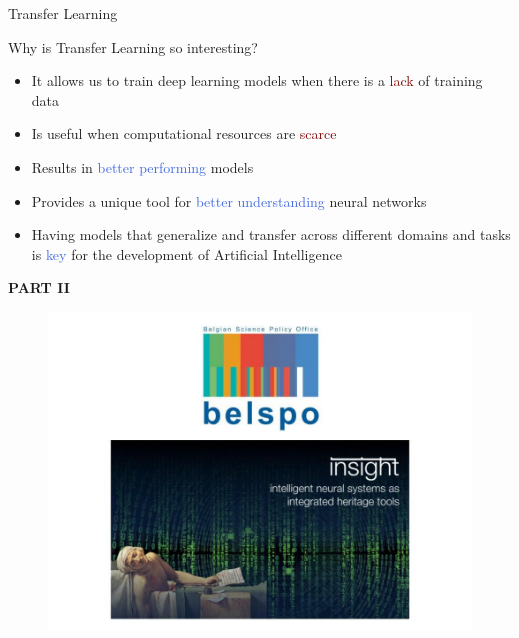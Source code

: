 \documentclass{beamer}
\begin{document}
\begin{frame}{Transfer Learning}

	Why is Transfer Learning so interesting?

	\begin{itemize}
		\item It allows us to train deep learning models when there is a \textcolor{Maroon}{lack} of training data
		\item Is useful when computational resources are \textcolor{Maroon}{scarce}
		\item Results in \textcolor{RoyalBlue}{better performing} models
		\item Provides a unique tool for \textcolor{RoyalBlue}{better understanding} neural networks  
		\item Having models that generalize and transfer across different domains and tasks is \textcolor{RoyalBlue}{key} for the development of Artificial Intelligence 
	\end{itemize}


\end{frame}


\begin{frame}
	\begin{center}
		\textcolor{skymagenta}{\textbf{PART II}}
	\end{center}
\end{frame}

\begin{frame}
	\begin{figure}
		\includegraphics[width=1\textwidth]{figures/insight}
	\end{figure}
\end{frame}
\end{document}
